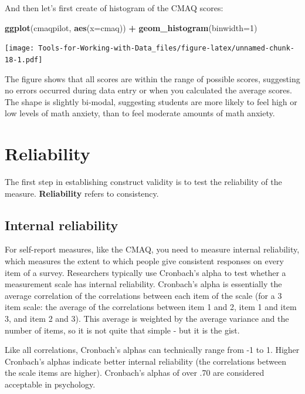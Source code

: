 \documentclass[
]{book}
\newenvironment{Shaded}{\begin{snugshade}}{\end{snugshade}}
\newcommand{\DataTypeTok}[1]{\textcolor[rgb]{0.13,0.29,0.53}{#1}}
\newcommand{\DecValTok}[1]{\textcolor[rgb]{0.00,0.00,0.81}{#1}}
\newcommand{\KeywordTok}[1]{\textcolor[rgb]{0.13,0.29,0.53}{\textbf{#1}}}
\newcommand{\NormalTok}[1]{#1}
\newcommand{\OperatorTok}[1]{\textcolor[rgb]{0.81,0.36,0.00}{\textbf{#1}}}
\newcommand{\StringTok}[1]{\textcolor[rgb]{0.31,0.60,0.02}{#1}}
\begin{document}
And then let's first create of histogram of the CMAQ scores:

\begin{Shaded}
\begin{Highlighting}[]
\KeywordTok{ggplot}\NormalTok{(cmaqpilot, }\KeywordTok{aes}\NormalTok{(}\DataTypeTok{x=}\NormalTok{cmaq)) }\OperatorTok{+}\StringTok{ }
\StringTok{  }\KeywordTok{geom_histogram}\NormalTok{(}\DataTypeTok{binwidth=}\DecValTok{1}\NormalTok{)}
\end{Highlighting}
\end{Shaded}

\texttt{[image: Tools-for-Working-with-Data\_files/figure-latex/unnamed-chunk-18-1.pdf]}

The figure shows that all scores are within the range of possible scores, suggesting no errors occurred during data entry or when you calculated the average scores. The shape is slightly bi-modal, suggesting students are more likely to feel high or low levels of math anxiety, than to feel moderate amounts of math anxiety.

\hypertarget{reliability}{%
\section{Reliability}\label{reliability}}

The first step in establishing construct validity is to test the reliability of the measure. \textbf{Reliability} refers to consistency.

\hypertarget{internal-reliability}{%
\subsection{Internal reliability}\label{internal-reliability}}

For self-report measures, like the CMAQ, you need to measure internal reliability, which measures the extent to which people give consistent responses on every item of a survey. Researchers typically use Cronbach's alpha to test whether a measurement scale has internal reliability. Cronbach's alpha is essentially the average correlation of the correlations between each item of the scale (for a 3 item scale: the average of the correlations between item 1 and 2, item 1 and item 3, and item 2 and 3). This average is weighted by the average variance and the number of items, so it is not quite that simple - but it is the gist.

Like all correlations, Cronbach's alphas can technically range from -1 to 1. Higher Cronbach's alphas indicate better internal reliability (the correlations between the scale items are higher). Cronbach's alphas of over .70 are considered acceptable in psychology.
\end{document}
